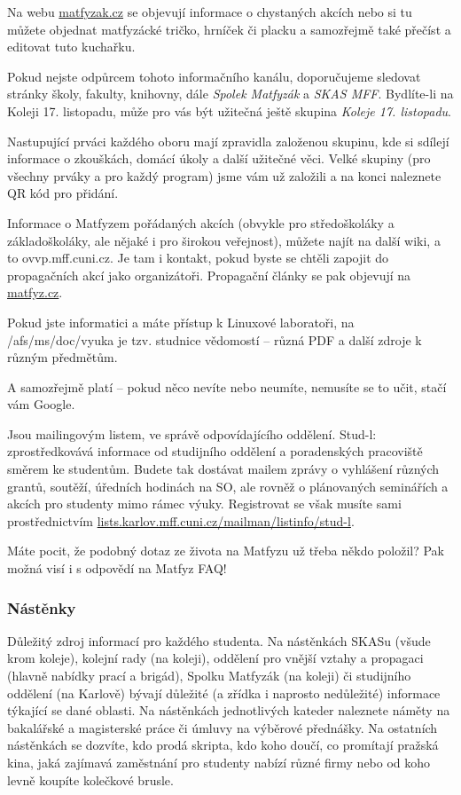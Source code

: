Na webu \url{matfyzak.cz} se objevují informace o chystaných akcích nebo si tu
můžete objednat matfyzácké tričko, hrníček či placku a samozřejmě také přečíst a
editovat tuto kuchařku.


Pokud nejste odpůrcem tohoto informačního kanálu, doporučujeme sledovat stránky
školy, fakulty, knihovny, dále \textit{Spolek Matfyzák} a \textit{SKAS MFF}.
Bydlíte-li na Koleji 17. listopadu, může pro vás být užitečná ještě skupina
\textit{Koleje 17. listopadu}.

Nastupující prváci každého oboru mají zpravidla založenou skupinu, kde si
sdílejí informace o zkouškách, domácí úkoly a další užitečné věci. Velké skupiny
(pro všechny prváky a pro každý program) jsme vám už založili a na konci
naleznete QR kód pro přidání.


Informace o Matfyzem pořádaných akcích (obvykle pro středoškoláky a
základoškoláky, ale nějaké i pro širokou veřejnost), můžete najít na další wiki,
a to ovvp.mff.cuni.cz. Je tam i kontakt, pokud byste se chtěli zapojit do
propagačních akcí jako organizátoři. Propagační články se pak objevují na
\url{matfyz.cz}.

Pokud jste informatici a máte přístup k Linuxové laboratoři, na
/afs/ms/doc/vyuka je tzv. studnice vědomostí – různá PDF a další zdroje k různým
předmětům.

A samozřejmě platí – pokud něco nevíte nebo neumíte, nemusíte se to učit, stačí
vám Google.

Jsou mailingovým listem, ve správě odpovídajícího oddělení. Stud-l:
zprostředkovává informace od studijního oddělení a poradenských pracoviště
směrem ke studentům. Budete tak dostávat mailem zprávy o vyhlášení různých
grantů, soutěží, úředních hodinách na SO, ale rovněž o plánovaných seminářích a
akcích pro studenty mimo rámec výuky. Registrovat se však musíte sami
prostřednictvím \url{lists.karlov.mff.cuni.cz/mailman/listinfo/stud-l}.

Máte pocit, že podobný dotaz ze života na Matfyzu už třeba někdo položil? Pak
možná visí i s odpovědí na Matfyz FAQ!


\subsubsection{Nástěnky}
Důležitý zdroj informací pro každého studenta. Na nástěnkách SKASu (všude krom
koleje), kolejní rady (na koleji), oddělení pro vnější vztahy a propagaci
(hlavně nabídky prací a brigád), Spolku Matfyzák (na koleji) či studijního
oddělení (na Karlově) bývají důležité (a zřídka i naprosto nedůležité) informace
týkající se dané oblasti. Na nástěnkách jednotlivých kateder naleznete náměty na
bakalářské a magisterské práce či úmluvy na výběrové přednášky. Na ostatních
nástěnkách se dozvíte, kdo prodá skripta, kdo koho doučí, co promítají pražská
kina, jaká zajímavá zaměstnání pro studenty nabízí různé firmy nebo od koho
levně koupíte kolečkové brusle.


